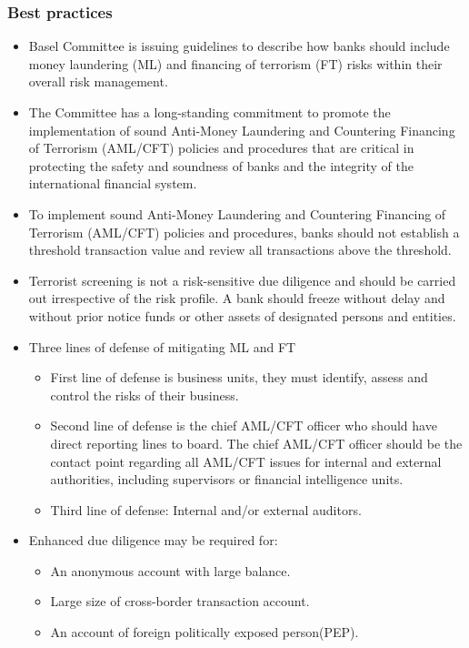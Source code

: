 \subsubsection{Best practices }
\begin{itemize}
\item Basel Committee is issuing guidelines to describe how banks should include money laundering (ML) and financing of terrorism (FT) risks within their overall risk management.
\item The Committee has a long-standing commitment to promote the implementation of sound Anti-Money Laundering and Countering Financing of Terrorism (AML/CFT) policies and procedures that are critical in protecting the safety and soundness of banks and the integrity of the international financial system.
\item To implement sound Anti-Money Laundering and Countering Financing of Terrorism (AML/CFT) policies and procedures, banks should not establish a threshold transaction value and review all transactions above the threshold.
\item Terrorist screening is not a risk-sensitive due diligence and should be carried out irrespective of the risk profile. A bank should freeze without delay and without prior notice funds or other assets of designated persons and entities.
\item Three lines of defense of mitigating ML and FT
    \begin{itemize}
    \item First line of defense is business units, they must identify, assess and control the risks of their business.
    \item Second line of defense is the chief AML/CFT officer who should have direct reporting lines to board. The chief AML/CFT officer should be the contact point regarding all AML/CFT issues for internal and external authorities, including supervisors or financial intelligence units.
    \item Third line of defense: Internal and/or external auditors.
    \end{itemize}
    
\item Enhanced due diligence may be required for:
    \begin{itemize}
    \item An anonymous account with large balance.
    \item Large size of cross-border transaction account.
    \item An account of foreign politically exposed person(PEP).
    

\end{itemize}
\end{itemize}
